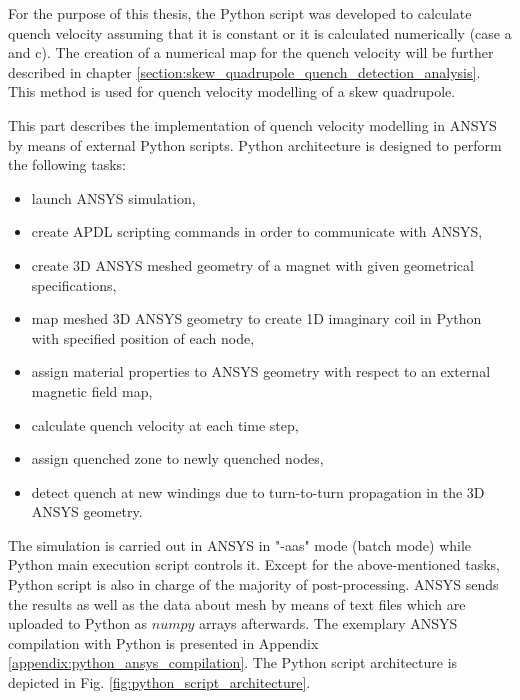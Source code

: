 
For the purpose of this thesis, the Python script was developed to calculate quench velocity assuming that it is constant or it is calculated numerically (case a and c). The creation of a numerical map for the quench velocity will be further described in chapter \ref{section:skew_quadrupole_quench_detection_analysis}. This method is used for quench velocity modelling of a skew quadrupole.

This part describes the implementation of quench velocity modelling in ANSYS by means of external Python scripts. Python architecture is designed to perform the following tasks: 

\begin{itemize}
\item launch ANSYS simulation,
\item create APDL scripting commands in order to communicate with ANSYS,
\item create 3D ANSYS meshed geometry of a magnet with given geometrical specifications,
\item map meshed 3D ANSYS geometry to create 1D imaginary coil in Python with specified position of each node,
\item assign material properties to ANSYS geometry with respect to an external magnetic field map,
\item calculate quench velocity at each time step, 
\item assign quenched zone to newly quenched nodes,
\item detect quench at new windings due to turn-to-turn propagation in the 3D ANSYS geometry.
\end{itemize}
 
The simulation is carried out in ANSYS in "-aas" mode (batch mode) while Python main execution script controls it. Except for the above-mentioned tasks, Python script is also in charge of the majority of post-processing. ANSYS sends the results as well as the data about mesh by means of text files which are uploaded to Python as $numpy$ arrays afterwards. The exemplary ANSYS compilation with Python is presented in Appendix \ref{appendix:python_ansys_compilation}. The Python script architecture is depicted in Fig. \ref{fig:python_script_architecture}.

